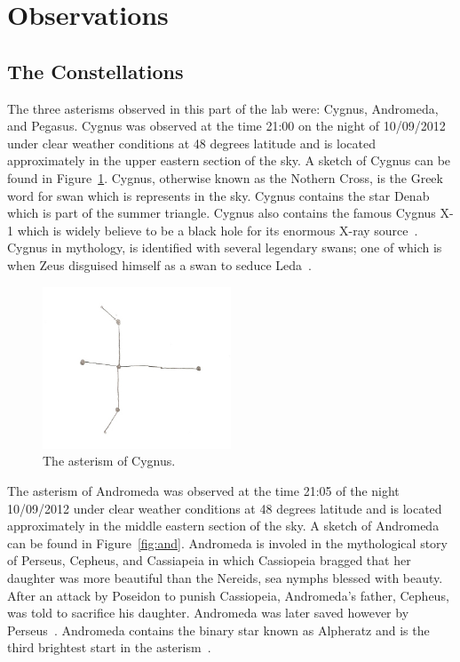 \documentclass{article}
\begin{document}
\section{Observations}

\subsection{The Constellations}
The three asterisms observed in this part of the lab were: Cygnus, Andromeda, and Pegasus. Cygnus was observed at the time
21:00 on the night of 10/09/2012 under clear weather conditions at 48 degrees latitude and is located approximately in
the upper eastern section of the sky. A sketch of Cygnus can be found in
Figure~\ref{fig:cygnus}. Cygnus, otherwise known as the Nothern Cross, is the Greek word for swan which is represents in the sky.
Cygnus contains the star Denab which is part of the summer triangle. Cygnus also contains the famous Cygnus X-1 which is widely
believe to be a black hole for its enormous X-ray source~\cite{ESA:2012}. Cygnus in mythology, is identified with several legendary
swans; one of which is when Zeus disguised himself as a swan to seduce Leda~\cite{Tirion:2001}.

\begin{figure}[h]
\centering
\includegraphics[width=0.5\textwidth]{images/cygnus}
\caption{The asterism of Cygnus.\label{fig:cygnus}}
\end{figure}

The asterism of Andromeda was observed at the time 21:05 of the night 10/09/2012 under clear weather conditions at 48 degrees
latitude and is located approximately in the middle eastern section of the sky. A sketch of Andromeda can be found in Figure~\ref{fig:and}.
Andromeda is involed in the mythological story of Perseus, Cepheus, and Cassiapeia in which Cassiopeia bragged that her daughter
was more beautiful than the Nereids, sea nymphs blessed with beauty. After an attack by Poseidon to punish Cassiopeia, Andromeda's
father, Cepheus, was told to sacrifice his daughter. Andromeda was later saved however by Perseus~\cite{Thompson:2007}. Andromeda
contains the binary star known as Alpheratz and is the third brightest start in the asterism~\cite{Moore:2000}.
\end{document}
